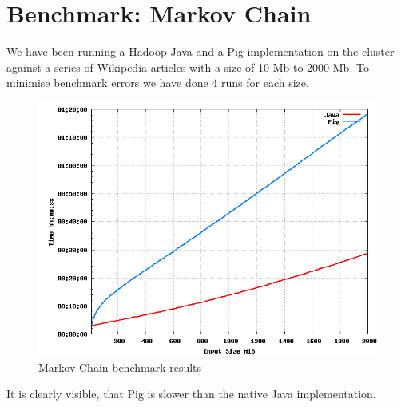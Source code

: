 \section{Benchmark: Markov Chain}

We have been running a Hadoop Java and a Pig implementation on the cluster against a series of Wikipedia articles with a size of 10 Mb to 2000 Mb. To minimise benchmark errors we have done 4 runs for each size.

\begin{figure}[H]
  \begin{center}
    \includegraphics[width=\textwidth]{../benchmarks/markov}
  \end{center}
  \caption{Markov Chain benchmark results}
  \label{fig:reducers}
\end{figure}

It is clearly visible, that Pig is slower than the native Java implementation.